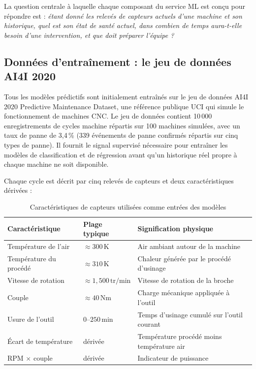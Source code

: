 La question centrale à laquelle chaque composant du service ML est conçu pour répondre est : \emph{étant donné les relevés de capteurs actuels d'une machine et son historique, quel est son état de santé actuel, dans combien de temps aura-t-elle besoin d'une intervention, et que doit préparer l'équipe ?}

\subsection{Données d'entraînement : le jeu de données AI4I 2020}

Tous les modèles prédictifs sont initialement entraînés sur le jeu de données AI4I 2020 Predictive Maintenance Dataset, une référence publique UCI qui simule le fonctionnement de machines CNC. Le jeu de données contient 10\,000 enregistrements de cycles machine répartis sur 100 machines simulées, avec un taux de panne de 3,4\,\% (339 événements de panne confirmés répartis sur cinq types de panne). Il fournit le signal supervisé nécessaire pour entraîner les modèles de classification et de régression avant qu'un historique réel propre à chaque machine ne soit disponible.

Chaque cycle est décrit par cinq relevés de capteurs et deux caractéristiques dérivées :

\begin{table}[h]
\centering
\begin{tabularx}{\textwidth}{|X|X|X|}
\toprule
\textbf{Caractéristique} & \textbf{Plage typique} & \textbf{Signification physique} \\
\midrule
Température de l'air     & $\approx 300\,\mathrm{K}$   & Air ambiant autour de la machine \\
\midrule
Température du procédé & $\approx 310\,\mathrm{K}$   & Chaleur générée par le procédé d'usinage \\
\midrule
Vitesse de rotation    & $\approx 1{,}500\,\mathrm{tr/min}$ & Vitesse de rotation de la broche \\
\midrule
Couple              & $\approx 40\,\mathrm{Nm}$   & Charge mécanique appliquée à l'outil \\
\midrule
Usure de l'outil           & $0$--$250\,\mathrm{min}$    & Temps d'usinage cumulé sur l'outil courant \\
\midrule
Écart de température   & dérivée                     & Température procédé moins température air \\
\midrule
RPM $\times$ couple & dérivée                     & Indicateur de puissance \\
\bottomrule
\end{tabularx}
\caption{Caractéristiques de capteurs utilisées comme entrées des modèles}
\label{tab:features}
\end{table}

